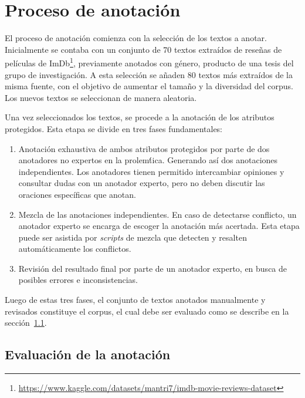 \section{Proceso de anotaci\'on}\label{section:annotation_process}
El proceso de anotaci\'on comienza con la selecci\'on de los textos a anotar. Inicialmente se contaba con un conjunto de 70 textos 
extra\'idos de rese\~nas de pel\'iculas de ImDb\footnote{\url{https://www.kaggle.com/datasets/mantri7/imdb-movie-reviews-dataset}}, 
previamente anotados con g\'enero, producto de una tesis del grupo de investigaci\'on. A esta selecci\'on se a\~naden 80 textos m\'as 
extra\'idos de la misma fuente, con el objetivo de aumentar el tama\~no y la diversidad del corpus. Los nuevos textos se seleccionan 
de manera aleatoria.

Una vez seleccionados los textos, se procede a la anotaci\'on de los atributos protegidos. Esta etapa se divide en tres fases 
fundamentales:

\begin{enumerate}
    \item Anotaci\'on exhaustiva de ambos atributos protegidos por parte de dos anotadores no expertos en la prolem\'tica. 
    Generando as\'i dos anotaciones independientes. Los anotadores tienen permitido intercambiar opiniones y consultar dudas
    con un anotador experto, pero no deben discutir las oraciones espec\'ificas que anotan.
    \item Mezcla de las anotaciones independientes. En caso de detectarse conflicto, un anotador experto se encarga de escoger la 
    anotaci\'on m\'as acertada. Esta etapa puede ser asistida por \emph{scripts} de mezcla que detecten y resalten autom\'aticamente
    los conflictos.
    \item Revisi\'on del resultado final por parte de un anotador experto, en busca de posibles errores e inconsistencias.
\end{enumerate}

Luego de estas tres fases, el conjunto de textos anotados manualmente y revisados constituye el corpus, el cual debe ser evaluado 
como se describe en la secci\'on~\ref{subsection:annotation_evaluation}.
\subsection{Evaluaci\'on de la anotaci\'on}\label{subsection:annotation_evaluation}


